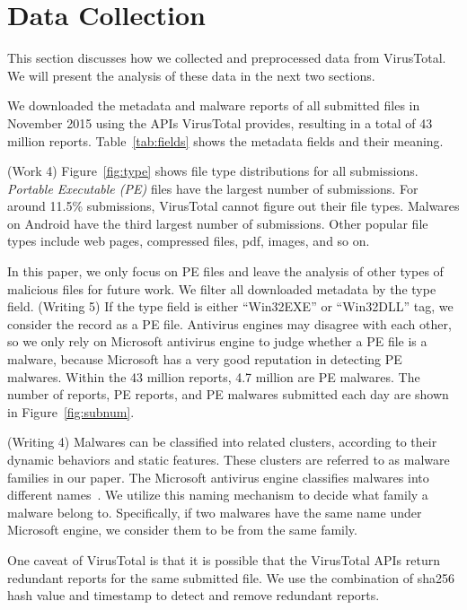 
\section{Data Collection}
\label{sec:meth}

This section discusses how we collected and preprocessed data from VirusTotal.
We will present the analysis of these data in the next two sections.



We downloaded the metadata and malware reports of all submitted files in November 2015 using the APIs VirusTotal provides,
resulting in a total of 43 million reports.
Table~\ref{tab:fields} shows the metadata fields and their meaning. 

{\color{red} (Work 4)
Figure~\ref{fig:type} shows file type distributions for all submissions. 
{\em Portable Executable (PE)}  files have the largest number of submissions. 
For around 11.5\% submissions, VirusTotal cannot figure out their file types. 
Malwares on Android have the third largest number of submissions.  
Other popular file types include web pages, compressed files, pdf, images, and so on. 
}

In this paper, we only focus on PE files 
and leave the analysis of other types of malicious files for future work. 
We filter all downloaded metadata by the type field. 
{\color{red} (Writing 5)
If the type field is either ``Win32EXE'' or ``Win32DLL'' tag, we consider the record as a PE file. 
Antivirus engines may disagree with each other, so
we only rely on Microsoft antivirus engine to judge whether a PE file is a malware, because
Microsoft has a very good reputation in detecting PE malwares. 
}
Within the 43 million reports, 4.7 million are PE malwares. 
The number of reports, PE reports, and PE malwares submitted each day are shown in Figure~\ref{fig:subnum}.

{\color{red} (Writing 4)
Malwares can be classified into related clusters, according to their dynamic behaviors and static features. 
These clusters are referred to as malware families in our paper. }
The Microsoft antivirus engine classifies malwares into different names~\cite{microsoft}. 
We utilize this naming mechanism to decide what family a malware belong to.
Specifically, if two malwares have the same name under Microsoft engine, we consider them to be from the same family.

One caveat of VirusTotal is that it is possible that the VirusTotal APIs return redundant reports 
for the same submitted file. 
We use the combination of sha256 hash value and timestamp to detect and remove redundant reports.

